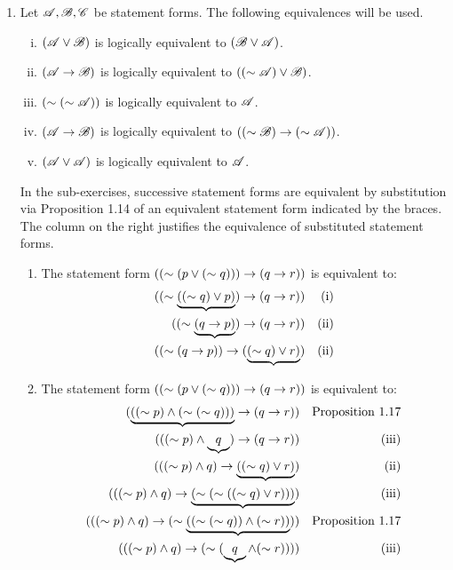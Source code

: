 \begin{enumerate}
  \item %
    Let \(\mathscr{A}, \mathscr{B}, \mathscr{C}\) be statement forms. The following equivalences will be used.
    \begin{enumerate}[(i)]
      \item \((\mathscr{A} \lor \mathscr{B})\) is logically equivalent to \((\mathscr{B} \lor \mathscr{A})\).
      \item \((\mathscr{A} \rightarrow \mathscr{B})\) is logically equivalent to \(((\sim\mathscr{A}) \lor \mathscr{B})\).
      \item \((\sim(\sim \mathscr{A}))\) is logically equivalent to \(\mathscr{A}\).
      \item \((\mathscr{A} \rightarrow \mathscr{B})\) is logically equivalent to \(((\sim\mathscr{B}) \rightarrow (\sim\mathscr{A}))\).
      \item \((\mathscr{A} \lor \mathscr{A})\) is logically equivalent to \(\mathscr{A}\).
    \end{enumerate}

    In the sub-exercises, successive statement forms are equivalent by substitution via Proposition 1.14 of an equivalent statement form indicated by the braces. The column on the right justifies the equivalence of substituted statement forms.

    \begin{enumerate}
      \item The statement form \(((\sim(p \lor (\sim q))) \rightarrow (q \rightarrow r))\) is equivalent to:
        \begin{align*}
          ((\sim\underbrace{((\sim q) \lor p)}) \rightarrow (q \rightarrow r))&&
          \text{(i)}\\
          ((\sim\underbrace{(q \rightarrow p)}) \rightarrow (q \rightarrow r))&&
          \text{(ii)}\\
          ((\sim(q \rightarrow p)) \rightarrow (\underbrace{(\sim q) \lor r)})&&
          \text{(ii)}
        \end{align*}

      \item The statement form \(((\sim(p \lor (\sim q))) \rightarrow (q \rightarrow r))\) is equivalent to:
        \begin{align*}
          (\underbrace{((\sim p) \land (\sim (\sim q)))} \rightarrow (q \rightarrow r))&&
          \text{Proposition 1.17}\\
          (((\sim p) \land \underbrace{q}) \rightarrow (q \rightarrow r))&&
          \text{(iii)}\\
          (((\sim p) \land q) \rightarrow \underbrace{((\sim q) \lor r)})&&
          \text{(ii)}\\
          (((\sim p) \land q) \rightarrow \underbrace{(\sim(\sim((\sim q) \lor r)))})&&
          \text{(iii)}\\
          (((\sim p) \land q) \rightarrow (\sim\underbrace{((\sim(\sim q)) \land (\sim r))}))&&
          \text{Proposition 1.17}\\
          (((\sim p) \land q) \rightarrow (\sim(\underbrace{q} \land (\sim r))))&&
          \text{(iii)}
        \end{align*}


\end{enumerate}
\end{enumerate}
